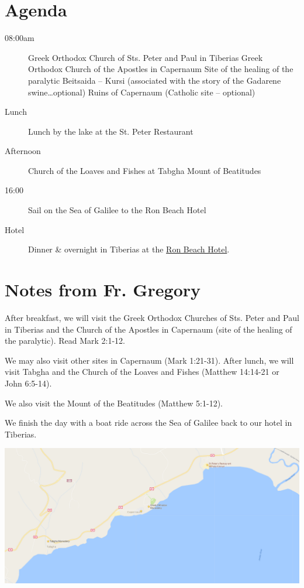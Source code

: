\documentclass[letterpaper]{report}
\begin{document}
\section{Agenda}
\begin{description}
	\item[08:00am]  Greek Orthodox Church of Sts. Peter and Paul in Tiberias 
	  \subitem Greek Orthodox Church of the Apostles in Capernaum
	  \subitem Site of the healing of the paralytic
	  \subitem Beitsaida – Kursi
	      (associated with the story of the Gadarene swine…optional)
	  \subitem Ruins of Capernaum (Catholic site – optional) 
	\item[Lunch] Lunch by the lake at the St. Peter Restaurant
	\item[Afternoon] Church of the Loaves and Fishes at Tabgha Mount of 
	     Beatitudes
	\item[16:00] Sail on the Sea of Galilee to the Ron Beach Hotel
	\item[Hotel] Dinner \& overnight in Tiberias at the
	  \href{http://www.ronbeachhotel.com/}{Ron Beach Hotel}.
\end{description}

\section{Notes from Fr. Gregory}
After breakfast, we will visit the Greek Orthodox Churches of
Sts. Peter and Paul in Tiberias and the Church of the Apostles in Capernaum
(site of the healing of the paralytic).
Read Mark 2:1-12.

We may also visit other sites in Capernaum (Mark 1:21-31).
After lunch, we will visit Tabgha and the Church of the Loaves and Fishes
(Matthew 14:14-21 or John 6:5-14).

We also visit the Mount of the Beatitudes (Matthew 5:1-12).

We finish the day with a boat ride across the Sea of Galilee back to our hotel 
in Tiberias.

\includegraphics[width=\textwidth]{Capernaum}
\end{document}
